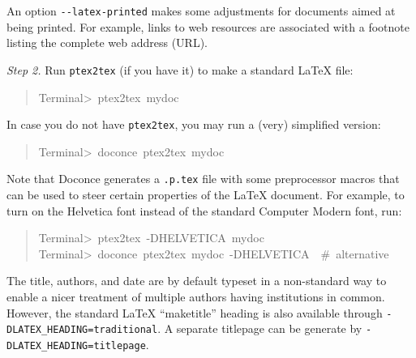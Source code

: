 \documentclass[a4paper]{article}
\begin{document}
An option \texttt{-{}-latex-printed} makes some adjustments for documents
aimed at being printed. For example, links to web resources are
associated with a footnote listing the complete web address (URL).

\emph{Step 2.} Run \texttt{ptex2tex} (if you have it) to make a standard LaTeX file:
%
\begin{quote}{\ttfamily \raggedright \noindent
Terminal>~ptex2tex~mydoc
}
\end{quote}

In case you do not have \texttt{ptex2tex}, you may run a (very) simplified version:
%
\begin{quote}{\ttfamily \raggedright \noindent
Terminal>~doconce~ptex2tex~mydoc
}
\end{quote}

Note that Doconce generates a \texttt{.p.tex} file with some preprocessor macros
that can be used to steer certain properties of the LaTeX document.
For example, to turn on the Helvetica font instead of the standard
Computer Modern font, run:
%
\begin{quote}{\ttfamily \raggedright \noindent
Terminal>~ptex2tex~-DHELVETICA~mydoc\\
Terminal>~doconce~ptex2tex~mydoc~-DHELVETICA~~\#~alternative
}
\end{quote}

The title, authors, and date are by default typeset in a non-standard
way to enable a nicer treatment of multiple authors having
institutions in common. However, the standard LaTeX ``maketitle'' heading
is also available through \texttt{-DLATEX\_HEADING=traditional}.
A separate titlepage can be generate by
\texttt{-DLATEX\_HEADING=titlepage}.
\end{document}

